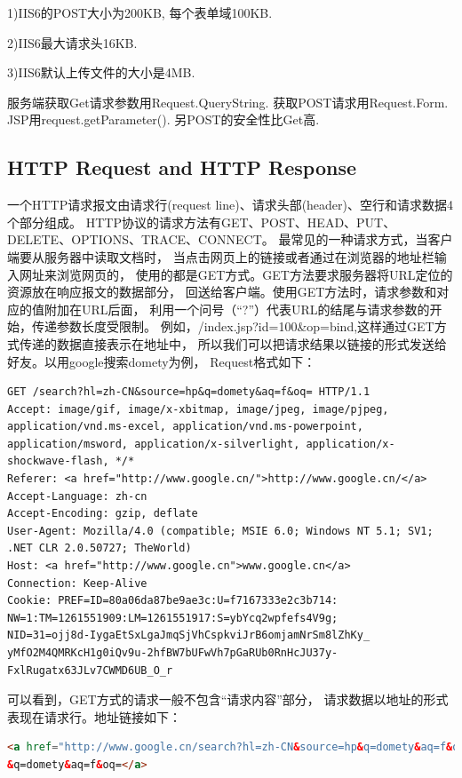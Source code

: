 \documentclass{book}
\begin{document}
1)IIS6的POST大小为200KB,
每个表单域100KB.

2)IIS6最大请求头16KB.

3)IIS6默认上传文件的大小是4MB.

服务端获取Get请求参数用Request.QueryString.
获取POST请求用Request.Form.
JSP用request.getParameter().
另POST的安全性比Get高.

\subsection{HTTP Request and HTTP Response}

一个HTTP请求报文由请求行(request line)、请求头部(header)、空行和请求数据4个部分组成。
HTTP协议的请求方法有GET、POST、HEAD、PUT、DELETE、OPTIONS、TRACE、CONNECT。
最常见的一种请求方式，当客户端要从服务器中读取文档时，
当点击网页上的链接或者通过在浏览器的地址栏输入网址来浏览网页的，
使用的都是GET方式。GET方法要求服务器将URL定位的资源放在响应报文的数据部分，
回送给客户端。使用GET方法时，请求参数和对应的值附加在URL后面，
利用一个问号（“?”）代表URL的结尾与请求参数的开始，传递参数长度受限制。
例如，/index.jsp?id=100\&op=bind,这样通过GET方式传递的数据直接表示在地址中，
所以我们可以把请求结果以链接的形式发送给好友。以用google搜索domety为例，
Request格式如下：

\begin{lstlisting}
GET /search?hl=zh-CN&source=hp&q=domety&aq=f&oq= HTTP/1.1  
Accept: image/gif, image/x-xbitmap, image/jpeg, image/pjpeg, application/vnd.ms-excel, application/vnd.ms-powerpoint, 
application/msword, application/x-silverlight, application/x-shockwave-flash, */*  
Referer: <a href="http://www.google.cn/">http://www.google.cn/</a>  
Accept-Language: zh-cn  
Accept-Encoding: gzip, deflate  
User-Agent: Mozilla/4.0 (compatible; MSIE 6.0; Windows NT 5.1; SV1; .NET CLR 2.0.50727; TheWorld)  
Host: <a href="http://www.google.cn">www.google.cn</a>  
Connection: Keep-Alive  
Cookie: PREF=ID=80a06da87be9ae3c:U=f7167333e2c3b714:
NW=1:TM=1261551909:LM=1261551917:S=ybYcq2wpfefs4V9g; 
NID=31=ojj8d-IygaEtSxLgaJmqSjVhCspkviJrB6omjamNrSm8lZhKy_
yMfO2M4QMRKcH1g0iQv9u-2hfBW7bUFwVh7pGaRUb0RnHcJU37y-
FxlRugatx63JLv7CWMD6UB_O_r  
\end{lstlisting}

可以看到，GET方式的请求一般不包含“请求内容”部分，
请求数据以地址的形式表现在请求行。地址链接如下：

\begin{lstlisting}[language=HTML]
<a href="http://www.google.cn/search?hl=zh-CN&source=hp&q=domety&aq=f&oq=">http://www.google.cn/search?hl=zh-CN&source=hp
&q=domety&aq=f&oq=</a> 
\end{lstlisting}
\end{document}
